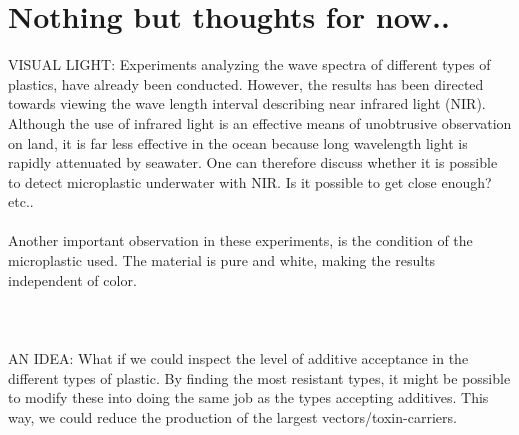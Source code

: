 \section{Nothing but thoughts for now..}
VISUAL LIGHT:
Experiments analyzing the wave spectra of different types of plastics, have already been conducted. However, the results has been directed towards viewing the wave length interval describing near infrared light (NIR). Although the use of infrared light is an effective means of unobtrusive observation on land, it is far less effective in the ocean because long wavelength light is rapidly attenuated by seawater. One can therefore discuss whether it is possible to detect microplastic underwater with NIR. Is it possible to get close enough? etc..
\\\\
Another important observation in these experiments, is the condition of the microplastic used. The material is pure and white, making the results independent of color. 
\\\\



\\\\
\noindent
AN IDEA: 
What if we could inspect the level of additive acceptance in the different types of plastic. By finding the most resistant types, it might be possible to modify these into doing the same job as the types accepting additives. This way, we could reduce the production of the largest vectors/toxin-carriers. 